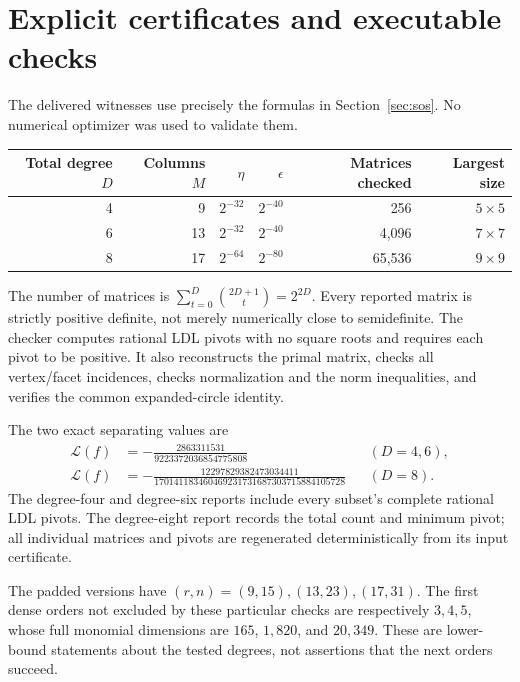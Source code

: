 \documentclass[11pt]{article}
\theoremstyle{definition}\newtheorem{definition}[theorem]{Definition}
\begin{document}
\section{Explicit certificates and executable checks}
\label{sec:certs}
The delivered witnesses use precisely the formulas in Section~\ref{sec:sos}. No numerical optimizer was used to validate them.

\begin{center}
\begin{tabular}{rrrrrr}
\toprule
Total degree $D$ & Columns $M$ & $\eta$ & $\epsilon$ & Matrices checked & Largest size\\
\midrule
4 & 9 & $2^{-32}$ & $2^{-40}$ & 256 & $5\times5$\\
6 & 13 & $2^{-32}$ & $2^{-40}$ & 4,096 & $7\times7$\\
8 & 17 & $2^{-64}$ & $2^{-80}$ & 65,536 & $9\times9$\\
\bottomrule
\end{tabular}
\end{center}
The number of matrices is $\sum_{t=0}^D\binom{2D+1}{t}=2^{2D}$. Every reported matrix is strictly positive definite, not merely numerically close to semidefinite. The checker computes rational LDL pivots with no square roots and requires each pivot to be positive. It also reconstructs the primal matrix, checks all vertex/facet incidences, checks normalization and the norm inequalities, and verifies the common expanded-circle identity.

The two exact separating values are
\begin{align}
 \mathcal L(f)&=-\frac{2863311531}{9223372036854775808}
 &&(D=4,6),\\
 \mathcal L(f)&=-\frac{12297829382473034411}{170141183460469231731687303715884105728}
 &&(D=8).
\end{align}
The degree-four and degree-six reports include every subset's complete rational LDL pivots. The degree-eight report records the total count and minimum pivot; all individual matrices and pivots are regenerated deterministically from its input certificate.

The padded versions have $(r,n)=(9,15),(13,23),(17,31)$. The first dense orders not excluded by these particular checks are respectively $3,4,5$, whose full monomial dimensions are $165$, $1,820$, and $20,349$. These are lower-bound statements about the tested degrees, not assertions that the next orders succeed.
\end{document}

